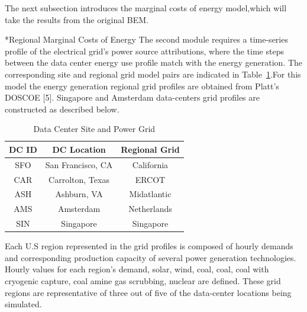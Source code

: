 \documentclass[twocolumn, a4paper,10pt]{article}
\makeatletter
\renewcommand\subsection{\@startsection{subsection}{1}{\z@}{\z@}{\z@}{\normalfont\normalsize\bfseries}}
\renewcommand\subsection{\@startsection{subsection}{1}{\z@}{\z@}{0.1pt}{\normalfont\normalsize\bfseries}}
\makeatother
\begin{document}
  The next subsection introduces the marginal costs of energy model,which will take the results from the original BEM.

\subsection*{Regional Marginal Costs of Energy}
The second module requires a time-series profile of the electrical grid’s power source attributions, where the time steps between the data center energy use profile match with the energy generation.  The corresponding  site and regional grid model pairs are indicated in Table~\ref{table:tab02}.For this model the energy generation regional grid profiles are obtained from Platt’s DOSCOE [5]. Singapore and Amsterdam data-centers grid profiles are constructed as described below.

\begin{table}[ht]
  \vspace{-10 pt}
  \caption{Data Center Site and Power Grid}
  \label{table:tab02}
  \centering
  \begin{tabular}{| c | c | c |  }
    \hline
    \bf{DC ID} & \bf{DC Location} & \bf{Regional Grid} \\
    \hline
    SFO & San Francisco, CA & California \\
    \hline
    CAR & Carrolton, Texas & ERCOT \\
    \hline
    ASH & Ashburn, VA & Midatlantic \\
    \hline
    AMS & Amsterdam & Netherlands \\
    \hline
    SIN & Singapore & Singapore \\
    \hline
  \end{tabular}
  \vspace{-10 pt}   %
  \end{table}

  Each U.S region represented in the grid profiles is composed of hourly demands and corresponding production capacity of several power generation technologies. Hourly values for each region’s demand, solar, wind, coal, coal, coal with cryogenic capture, coal amine gas scrubbing, nuclear are defined. These grid regions are representative of three out of five of the data-center locations being simulated. 
  
\end{document}
